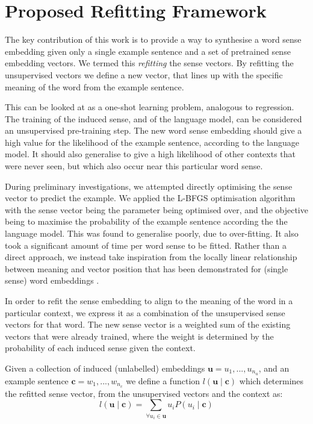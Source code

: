 \documentclass{article}
\def\parencite{\cite}
\renewcommand{\c}{\mathbf{c}}
\renewcommand{\u}{\mathbf{u}}
\begin{document}
\section{Proposed Refitting Framework} \label{refitting} \label{Framework}

The key contribution of this work is to provide a way to synthesise a word sense embedding given only a single example sentence and a set of pretrained sense embedding vectors. 
We termed this \emph{refitting} the sense vectors.
By refitting the unsupervised vectors we define a new vector, that lines up with the specific meaning of the word from the example sentence.

This can be looked at as a one-shot learning problem, analogous to regression.
The training of the induced sense, and of the language model, can be considered an unsupervised pre-training step.
The new word sense embedding should give a high value for the likelihood of the example sentence, according to the language model.
It should also generalise to give a high likelihood of other contexts that were never seen, but which also occur near this particular word sense.

During preliminary investigations, we attempted directly optimising the sense vector to predict the example.
We applied the L-BFGS \parencite{nocedal1980updating} optimisation algorithm with the sense vector being the parameter being optimised over, and the objective being to maximise the probability of the example sentence according the the language model.
This was found to generalise poorly, due to over-fitting.
It also took a significant amount of time per word sense to be fitted.
Rather than a direct approach, we instead take inspiration from the locally linear relationship between meaning and vector position that has been demonstrated for (single sense) word embeddings \parencite{mikolov2013efficient,mikolovSkip,mikolov2013linguisticsubstructures}.

In order to refit the sense embedding to align to the meaning of the word in a particular context, we express it as a combination of the unsupervised sense vectors for that word.
The new sense vector is a weighted sum of the existing vectors that were already trained, where the weight is determined by the probability of each induced sense given the context.


Given a collection of induced (unlabelled) embeddings $\u={u_1,...,u_{n_u}}$, and an example sentence $\c={w_1,...,w_{n_c}}$ we define a function $l(\u \mid \c )$ which determines the refitted sense vector, from the unsupervised vectors and the context as:
\begin{equation} \label{eq:synth}
l(\u \mid \c ) = \sum_{\forall u_i \in \u} u_i P(u_i \mid \c)
\end{equation}
\end{document}
